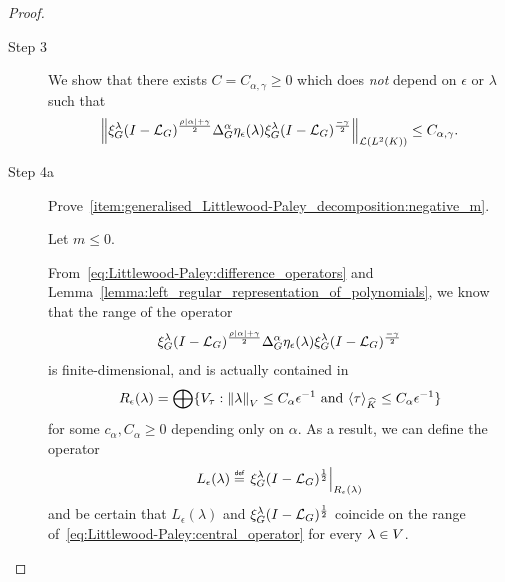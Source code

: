 \begin{proof}
\begin{description}
        \item [Step 3] We show that there exists $C = C_{\alpha, \gamma} \geq 0$ which does \emph{not} depend on $\epsilon$ or $\lambda$ such that
            \begin{align*}
                \norm [\Lin {\Lebesgue 2 \CompactGroup}] {%
                    \Rep \lambda \BesselPotential {\rho \abs \alpha + \gamma}
                    \DifferenceOperatorOrder \alpha \eta_\epsilon(\lambda)
                    \Rep \lambda \BesselPotential {-\gamma}
                } \leq C_{\alpha, \gamma}.
            \end{align*}

        \item [Step 4a] Prove~\ref{item:generalised_Littlewood-Paley_decomposition:negative_m}.

            Let $m \leq 0$.

            From~\eqref{eq:Littlewood-Paley:difference_operators} and Lemma~\ref{lemma:left_regular_representation_of_polynomials},
            we know that the range of the operator
            \begin{align}
                \xi^{\lambda}_{G} {(I - {\mathcal{L}_{G}})^\frac{\rho \left|{\alpha}\right| + \gamma}{2}}
                {\Delta_{G}^{\alpha}} \eta_\epsilon(\lambda)
                \xi^{\lambda}_{G} {(I - {\mathcal{L}_{G}})^\frac{-\gamma}{2}}
                \label{eq:Littlewood-Paley:central_operator}
            \end{align}
            is finite-dimensional,
            and is actually contained in
            \begin{align*}
                R_\epsilon(\lambda) =
                \bigoplus \{V_\tau : {\left\| \lambda \right\|}_{V} \leq C_\alpha \epsilon^{-1} \text{ and } {\langle \tau \rangle}_{{\widehat{K}}} \leq C_\alpha \epsilon^{-1} \}
            \end{align*}
            for some $c_\alpha, C_\alpha \geq 0$ depending only on $\alpha$.
            As a result,
            we can define the operator
            \begin{align*}
                L_\epsilon(\lambda) \defeq
                \eval {\Rep \lambda \BesselPotential 1} {R_\epsilon(\lambda)}
            \end{align*}
            and be certain that $L_\epsilon(\lambda)$ and $\xi^{\lambda}_{G} {(I - {\mathcal{L}_{G}})^\frac{1}{2}}$ coincide on the range of~\eqref{eq:Littlewood-Paley:central_operator}
            for every $\lambda \in V$.


\end{description}
\end{proof}
